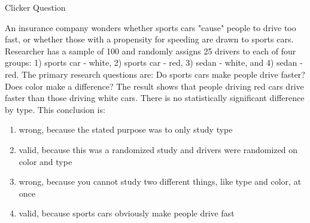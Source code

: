 \documentclass{beamer}
\begin{document}
\begin{frame}{Clicker Question}
	\small{An insurance company wonders whether sports cars "cause" people to drive too fast, or whether those with a propensity for speeding are drawn to sports cars. Researcher has a sample of 100 and randomly assigns 25 drivers to each of four groups: 1) sports car - white, 2) sports car - red, 3) sedan - white, and 4) sedan - red. The primary research questions are: Do sports cars make people drive faster? Does color make a difference? The result shows that people driving red cars drive faster than those driving white cars. There is no statistically significant difference by type. This conclusion is:
		
		\begin{enumerate}[label=(\alph*)]
			\item wrong, because the stated purpose was to only study type
			\item valid, because this was a randomized study and drivers were randomized on color and type
			\item wrong, because you cannot study two different things, like type and color, at once
			\item valid, because sports cars obviously make people drive fast
		\end{enumerate}}
\end{frame}
\end{document}
